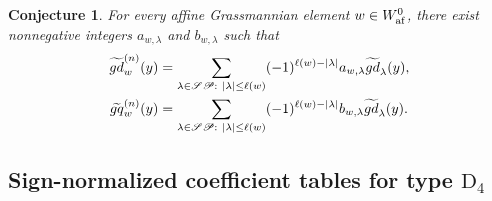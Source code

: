 \documentclass[a4paper]{amsart}
\newtheorem{conj}[thm]{Conjecture}
\theoremstyle{remark}
\numberwithin{equation}{section}
\begin{document}
\begin{conj}
 For every affine Grassmannian element \(w\in \Wafgr\), there exist nonnegative integers \(a_{w,\lambda}\) and \(b_{w,\lambda}\) such that
  \begin{align}
      \tgd{w}{n}(y)&=\sum_{\lambda\in \SP:~|\lambda|\leq\ell(w)}(-1)^{\ell(w)-|\lambda|}a_{w,\lambda}\widetilde{gd}_{\lambda}(y),\\
      \tgq{w}{n}(y)&=\sum_{\lambda\in \SP:~|\lambda|\leq \ell(w)}(-1)^{\ell(w)-|\lambda|}b_{w,\lambda}\widetilde{gd}_{\lambda}(y).
  \end{align}
\end{conj}


\subsection{Sign-normalized coefficient tables for type $\mathrm{D}_4$}
\end{document}
